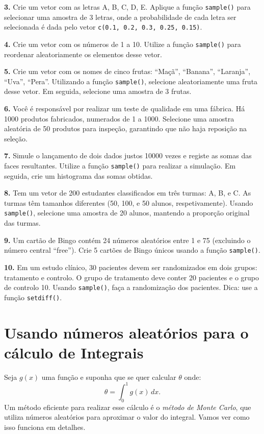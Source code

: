 \documentclass[
]{book}
\begin{document}
\textbf{3.} Crie um vetor com as letras A, B, C, D, E. Aplique a função
\texttt{sample()} para selecionar uma amostra de 3 letras, onde a probabilidade
de cada letra ser selecionada é dada pelo vetor
\texttt{c(0.1,\ 0.2,\ 0.3,\ 0.25,\ 0.15)}.

\textbf{4.} Crie um vetor com os números de 1 a 10. Utilize a função
\texttt{sample()} para reordenar aleatoriamente os elementos desse vetor.

\textbf{5.} Crie um vetor com os nomes de cinco frutas: ``Maçã'', ``Banana'',
``Laranja'', ``Uva'', ``Pera''. Utilizando a função \texttt{sample()}, selecione
aleatoriamente uma fruta desse vetor. Em seguida, selecione uma amostra
de 3 frutas.

\textbf{6.} Você é responsável por realizar um teste de qualidade em uma
fábrica. Há 1000 produtos fabricados, numerados de 1 a 1000. Selecione
uma amostra aleatória de 50 produtos para inspeção, garantindo que não
haja reposição na seleção.

\textbf{7.} Simule o lançamento de dois dados justos 10000 vezes e registe as
somas das faces resultantes. Utilize a função \texttt{sample()} para realizar a
simulação. Em seguida, crie um histograma das somas obtidas.

\textbf{8.} Tem um vetor de 200 estudantes classificados em três turmas: A,
B, e C. As turmas têm tamanhos diferentes (50, 100, e 50 alunos,
respetivamente). Usando \texttt{sample()}, selecione uma amostra de 20 alunos,
mantendo a proporção original das turmas.

\textbf{9.} Um cartão de Bingo contém 24 números aleatórios entre 1 e 75
(excluindo o número central ``free''). Crie 5 cartões de Bingo únicos
usando a função \texttt{sample()}.

\textbf{10.} Em um estudo clínico, 30 pacientes devem ser randomizados em
dois grupos: tratamento e controlo. O grupo de tratamento deve conter 20
pacientes e o grupo de controlo 10. Usando \texttt{sample()}, faça a
randomização dos pacientes. Dica: use a função \texttt{setdiff()}.

\chapter{Usando números aleatórios para o cálculo de Integrais}\label{usando-nuxfameros-aleatuxf3rios-para-o-cuxe1lculo-de-integrais}

Seja \(g(x)\) uma função e suponha que se quer calcular \(\theta\) onde:
\[\theta = \int_{0}^{1}g(x)\, dx.\] Um método eficiente para realizar
esse cálculo é o \emph{método de Monte Carlo}, que utiliza números aleatórios
para aproximar o valor do integral. Vamos ver como isso funciona em
detalhes.
\end{document}
